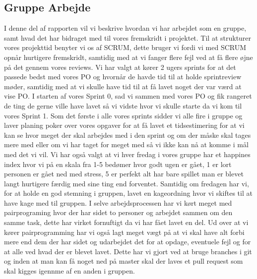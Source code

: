 \subsection{Gruppe Arbejde}
I denne del af rapporten vil vi beskrive hvordan vi har arbejdet som en gruppe, samt hvad det har bidraget med til vores fremskridt i projektet. 
Til at strukturer vores projekttid benyter vi os af SCRUM, dette bruger vi fordi vi med SCRUM opnår hurtigere fremskridt, samtidig med at vi fanger flere fejl ved at få flere øjne på det gennem vores reviews. Vi har valgt at kører 2 ugers sprints for at det passede bedst med vores PO og hvornår de havde tid til at holde sprintreview møder, samtidig med at vi skulle have tid til at få lavet noget der var værd at vise PO.
I starten af vores Sprint 0, sad vi sammen med vores PO og fik rangeret de ting de gerne ville have lavet så vi vidste hvor vi skulle starte da vi kom til vores Sprint 1. Som det første i alle vores sprints sidder vi alle fire i gruppe og laver planing poker over vores opgaver for at få lavet et tidsestimering for at vi kan se hvor meget der skal arbejdes med i den sprint og om der måske skal tages mere med eller om vi har taget for meget med så vi ikke kan nå at komme i mål med det vi vil. Vi har også valgt at vi hver fredag i vores gruppe har et happines index hvor vi på en skala fra 1-5 bedømer hvor godt ugen er gået, 1 er lort personen er gået ned med stress, 5 er perfekt alt har bare spillet man er blevet langt hurtigere færdig med sine ting end forventet. Samtidig om fredagen har vi, for at holde en god stemning i gruppen, lavet en kageordning hvor vi skiftes til at have kage med til gruppen.
I selve arbejdsprocessen har vi kørt meget med pairprograming hvor der har sidet to personer og arbejdet sammen om den samme task, dette har virket fornuftigt da vi har fået lavet en del. Ud over at vi kører pairprogramming har vi også lagt meget vægt på at vi skal have alt forbi mere end dem der har sidet og udarbejdet det for at opdage, eventuele fejl og for at alle ved hvad der er blevet lavet. Dette har vi gjort ved at bruge branches i git og inden at man kan få noget ned på master skal der laves et pull request som skal kigges igennme af en anden i gruppen.